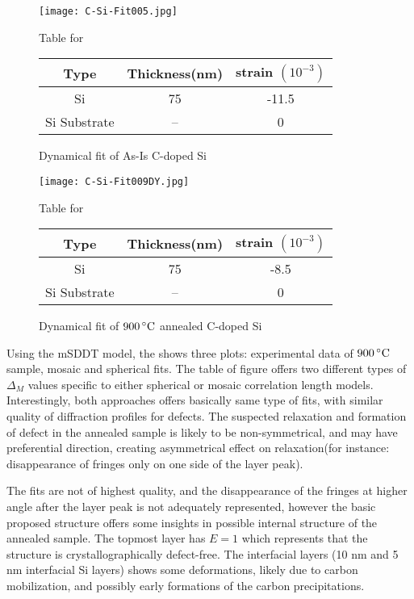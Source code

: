 \begin{figure}[h]
\caption{Dynamical fit of As-Is C-doped Si}
\label{DyFit-C-Si}
\texttt{[image: C-Si-Fit005.jpg]}
\begin{minipage}{\linewidth}
\centering
\vspace{10pt}
Table for \\
\begin{tabular}[htbp]{@{}c|cc@{}}
    \hline
  Type & Thickness(nm) & strain $(10^{-3})$ \\
    \hline
 Si	& 	75& -11.5\\
  Si Substrate & --  & 0
  \end{tabular}
\end{minipage}
\end{figure}

\begin{figure}[h]
\caption{Dynamical fit of $900\,^{\circ}\mathrm{C}$ annealed C-doped Si}
\label{DyFit-C-Si009}
\texttt{[image: C-Si-Fit009DY.jpg]}
\begin{minipage}{\linewidth}
\centering
\vspace{10pt}
Table for \\
\begin{tabular}[htbp]{@{}c|cc@{}}
    \hline
  Type & Thickness(nm) & strain $(10^{-3})$ \\
    \hline
 Si	& 	75& -8.5\\
  Si Substrate & --  & 0
  \end{tabular}
\end{minipage}
\end{figure}

Using the mSDDT model, the  shows three plots:  experimental data of $900\,^{\circ}\mathrm{C}$ sample, mosaic and spherical fits.  The table of figure offers two different types of $\Delta_M$  values specific to either spherical or mosaic correlation length models.  Interestingly, both approaches offers basically same type of fits, with similar quality of diffraction profiles for defects.  The suspected relaxation and formation of defect in the annealed sample is likely to be non-symmetrical, and may have preferential direction, creating asymmetrical effect on relaxation(for instance:  disappearance of fringes only on one side of the layer peak).

The fits are not of highest quality, and the disappearance of the fringes at higher angle after the layer peak is not adequately represented,  however the basic proposed structure offers some insights in possible internal structure of the annealed sample.  The topmost layer has $E=1$ which represents that the structure is crystallographically defect-free.  The interfacial layers (10 nm and 5 nm interfacial Si layers) shows some deformations, likely due to carbon mobilization, and possibly early formations of the carbon precipitations.

